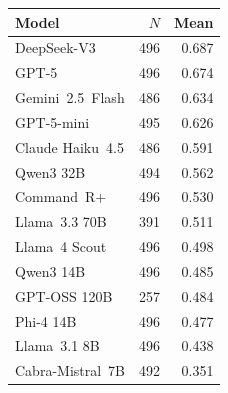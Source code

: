 \begin{tabular}{lrr}
\toprule
Model & $N$ & Mean \\
\midrule
DeepSeek-V3      & 496 & 0.687 \\
GPT-5            & 496 & 0.674 \\
Gemini~2.5~Flash & 486 & 0.634 \\
GPT-5-mini       & 495 & 0.626 \\
Claude Haiku~4.5 & 486 & 0.591 \\
Qwen3 32B        & 494 & 0.562 \\
Command~R+       & 496 & 0.530 \\
Llama~3.3 70B    & 391 & 0.511 \\
Llama~4 Scout    & 496 & 0.498 \\
Qwen3 14B        & 496 & 0.485 \\
GPT-OSS 120B     & 257 & 0.484 \\
Phi-4 14B        & 496 & 0.477 \\
Llama~3.1 8B     & 496 & 0.438 \\
Cabra-Mistral~7B & 492 & 0.351 \\
\bottomrule
\end{tabular}
